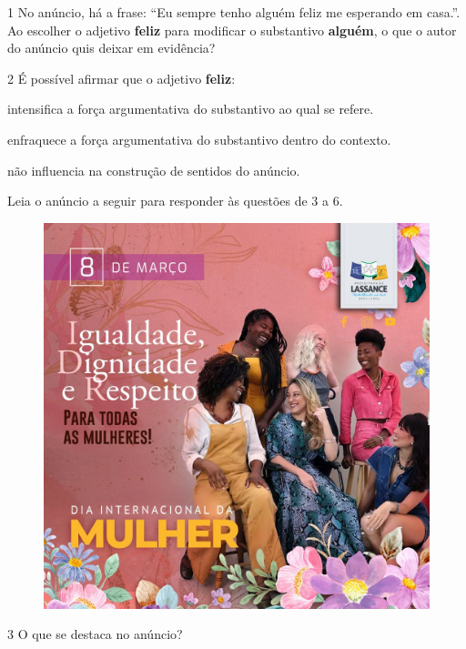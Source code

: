 \num{1} No anúncio, há a frase: ``Eu sempre tenho alguém feliz me
esperando em casa.''. Ao escolher o adjetivo \textbf{feliz} para
modificar o substantivo \textbf{alguém}, o que o autor do anúncio quis
deixar em evidência?


\num{2} É possível afirmar que o adjetivo \textbf{feliz}:

\begin{boxlist}
 intensifica a força argumentativa do substantivo ao qual se
refere.

 enfraquece a força argumentativa do substantivo dentro do contexto.

 não influencia na construção de sentidos do anúncio.
\end{boxlist}

\pagebreak
Leia o anúncio a seguir para responder às questões de 3 a 6.


\begin{figure}[htpb!]
\centering
\includegraphics[width=.8\textwidth]{./_SAEB_9_POR/media/image20.jpeg}
\end{figure}

\num{3} O que se destaca no anúncio?


